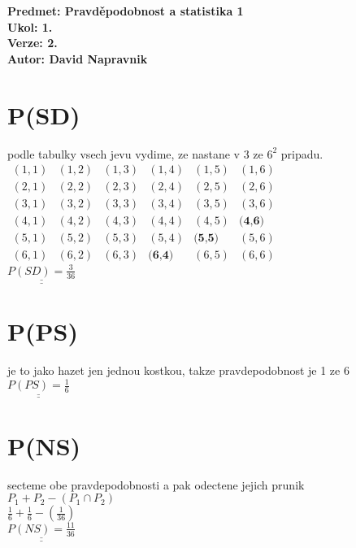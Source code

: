 \documentclass[a4paper]{article}
\def\doubleunderline#1{\underline{\underline{#1}}}
\begin{document}
\noindent
\textbf{Predmet: Pravděpodobnost a statistika 1}\\
\textbf{Ukol: 1.}\\
\textbf{Verze: 2.}\\
\textbf{Autor: David Napravnik}

\section*{P(SD)}
podle tabulky vsech jevu vydime, ze nastane v $3$ ze $6^2$ pripadu.\\
$
\begin{matrix}
	(1,1)&	(1,2)&	(1,3)&	(1,4)&	(1,5)&	(1,6)\\
	(2,1)&	(2,2)&	(2,3)&	(2,4)&	(2,5)&	(2,6)\\
	(3,1)&	(3,2)&	(3,3)&	(3,4)&	(3,5)&	(3,6)\\
	(4,1)&	(4,2)&	(4,3)&	(4,4)&	(4,5)&	\textbf{(4,6)}\\
	(5,1)&	(5,2)&	(5,3)&	(5,4)&	\textbf{(5,5)}&	(5,6)\\
	(6,1)&	(6,2)&	(6,3)&	\textbf{(6,4)}&	(6,5)&	(6,6)
\end{matrix}
$\\
$
\doubleunderline{P(SD)=\frac{3}{36}}
$


\section*{P(PS)}
je to jako hazet jen jednou kostkou, takze pravdepodobnost je 1 ze 6
\\$
\doubleunderline{P(PS)=\frac{1}{6}}
$


\section*{P(NS)}
secteme obe pravdepodobnosti a pak odectene jejich prunik\\
$P_1 + P_2 - (P_1 \cap P_2)$\\
$\frac{1}{6} + \frac{1}{6} - (\frac{1}{36})$\\
$
\doubleunderline{P(NS)=\frac{11}{36}}
$
\end{document}
